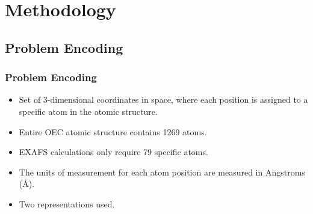 \documentclass[10pt]{beamer}
\begin{document}
\section{Methodology}

\subsection{Problem Encoding}

\begin{frame}
	\frametitle{Problem Encoding}

	\begin{itemize}
		\item Set of 3-dimensional coordinates in space, where each position is assigned to a specific atom in the atomic structure.
		\item Entire OEC atomic structure contains 1269 atoms.
		\item EXAFS calculations only require 79 specific atoms.
		\item The units of measurement for each atom position are measured in Angstroms (\AA).
		\item Two representations used.
	\end{itemize}

\end{frame}
\end{document}
